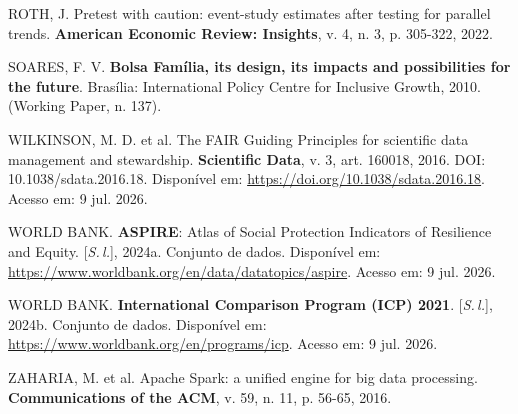 \documentclass[12pt,a4paper,oneside]{article}
\begin{document}
\begin{singlespace}
 ROTH, J. Pretest with caution: event-study estimates after testing for parallel trends. \textbf{American Economic Review: Insights}, v. 4, n. 3, p. 305-322, 2022.

 SOARES, F. V. \textbf{Bolsa Família, its design, its impacts and possibilities for the future}. Brasília: International Policy Centre for Inclusive Growth, 2010. (Working Paper, n. 137).

 WILKINSON, M. D. et al. The FAIR Guiding Principles for scientific data management and stewardship. \textbf{Scientific Data}, v. 3, art. 160018, 2016. DOI: 10.1038/sdata.2016.18. Disponível em: \url{https://doi.org/10.1038/sdata.2016.18}. Acesso em: 9 jul. 2026.

 WORLD BANK. \textbf{ASPIRE}: Atlas of Social Protection Indicators of Resilience and Equity. [\textit{S.\,l.}], 2024a. Conjunto de dados. Disponível em: \url{https://www.worldbank.org/en/data/datatopics/aspire}. Acesso em: 9 jul. 2026.

 WORLD BANK. \textbf{International Comparison Program (ICP) 2021}. [\textit{S.\,l.}], 2024b. Conjunto de dados. Disponível em: \url{https://www.worldbank.org/en/programs/icp}. Acesso em: 9 jul. 2026.

 ZAHARIA, M. et al. Apache Spark: a unified engine for big data processing. \textbf{Communications of the ACM}, v. 59, n. 11, p. 56-65, 2016.
\end{singlespace}
\end{document}
